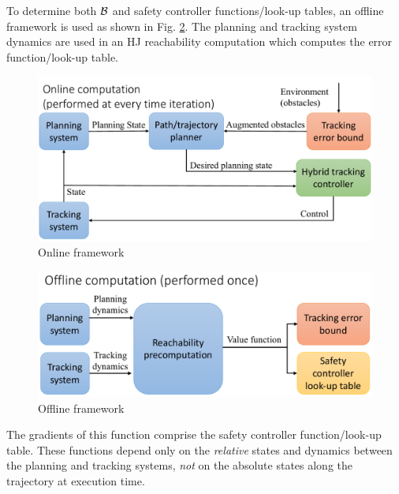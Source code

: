 To determine both $\mathcal B$ and safety controller functions/look-up tables, an offline framework is used as shown in Fig. \ref{fig:fw_offline}. The planning and tracking system dynamics are used in an HJ reachability computation which computes the error function/look-up table. 
\begin{figure}[h]
	\centering
	\includegraphics[width=0.9\columnwidth]{fig/framework_online}
	\caption{Online framework}
	\label{fig:fw_online}
	\vspace{-.1in}
\end{figure}
\begin{figure}[h]
	\centering
	\includegraphics[width=0.9\columnwidth]{fig/framework_offline}
	\caption{Offline framework}
	\label{fig:fw_offline}
	\vspace{-.1in}
\end{figure}
The gradients of this function comprise the safety controller function/look-up table. These functions depend only on the \textit{relative} states and dynamics between the planning and tracking systems, \textit{not} on the absolute states along the trajectory at execution time.





